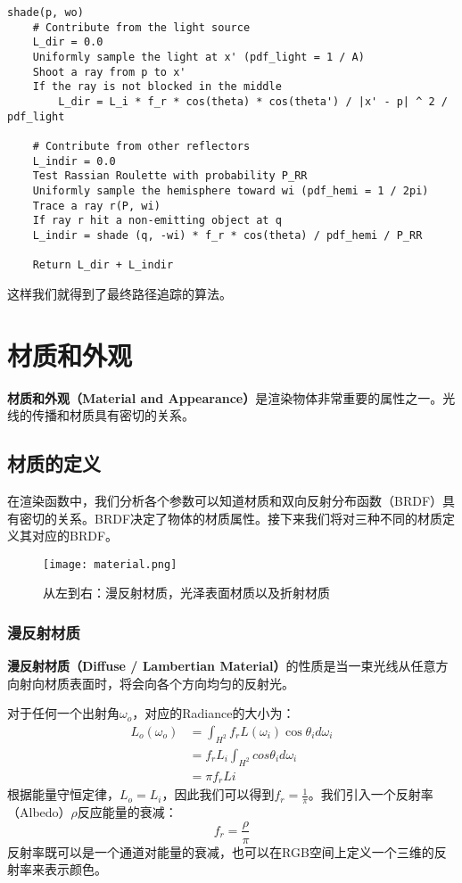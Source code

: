 \documentclass[openany]{progbookcn}
\begin{document}
\begin{lstlisting}[caption=渲染函数伪代码]
	shade(p, wo)
	# Contribute from the light source
	L_dir = 0.0
	Uniformly sample the light at x' (pdf_light = 1 / A)
	Shoot a ray from p to x'
	If the ray is not blocked in the middle
		L_dir = L_i * f_r * cos(theta) * cos(theta') / |x' - p| ^ 2 / pdf_light
	
	# Contribute from other reflectors
	L_indir = 0.0
	Test Rassian Roulette with probability P_RR
	Uniformly sample the hemisphere toward wi (pdf_hemi = 1 / 2pi)
	Trace a ray r(P, wi)
	If ray r hit a non-emitting object at q
	L_indir = shade (q, -wi) * f_r * cos(theta) / pdf_hemi / P_RR
	
	Return L_dir + L_indir
\end{lstlisting}

这样我们就得到了最终路径追踪的算法。


\chapter{材质和外观}

\textbf{材质和外观（Material and Appearance）}是渲染物体非常重要的属性之一。光线的传播和材质具有密切的关系。

\section{材质的定义}

在渲染函数中，我们分析各个参数可以知道材质和双向反射分布函数（BRDF）具有密切的关系。BRDF决定了物体的材质属性。接下来我们将对三种不同的材质定义其对应的BRDF。

\begin{figure}[H]
	\centering
	\texttt{[image: material.png]}
	\caption{从左到右：漫反射材质，光泽表面材质以及折射材质}
	\label{fig:material}
\end{figure}

\subsection{漫反射材质}
\textbf{漫反射材质（Diffuse / Lambertian Material）}的性质是当一束光线从任意方向射向材质表面时，将会向各个方向均匀的反射光。

对于任何一个出射角$\omega_o$，对应的Radiance的大小为：
\begin{equation}
	\begin{split}
		L_o(\omega_o)&=\int_{H^2}f_rL(\omega_i)\cos\theta_id\omega_i\\
		&=f_rL_i\int_{H^2}cos\theta_id\omega_i\\
		&=\pi f_r Li
	\end{split}
\end{equation}
根据能量守恒定律，$L_o=L_i$，因此我们可以得到$f_r=\frac{1}{\pi}$。我们引入一个反射率（Albedo）$\rho$反应能量的衰减：
\begin{equation}
	f_r=\frac{\rho}{\pi}
\end{equation}
反射率既可以是一个通道对能量的衰减，也可以在RGB空间上定义一个三维的反射率来表示颜色。
\end{document}
